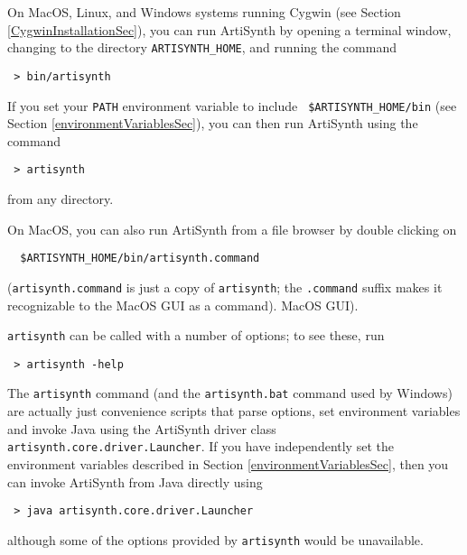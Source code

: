\documentclass{article}
\begin{document}

On MacOS, Linux, and Windows systems running Cygwin (see
Section \ref{CygwinInstallationSec}), you can run ArtiSynth by opening a terminal
window, changing to the directory {\tt ARTISYNTH\_HOME}, and running the
command

\begin{verbatim}
 > bin/artisynth
\end{verbatim}

If you set your {\tt PATH} environment variable to include {\tt
\$ARTISYNTH\_HOME/bin} (see Section \ref{environmentVariablesSec}), you
can then run ArtiSynth using the command

\begin{verbatim}
 > artisynth
\end{verbatim}

from any directory.

On MacOS, you can also run ArtiSynth from a file browser by double
clicking on
\begin{verbatim}
  $ARTISYNTH_HOME/bin/artisynth.command
\end{verbatim}
({\tt artisynth.command} is just a
copy of {\tt artisynth}; the {\tt .command} suffix makes it
recognizable to the MacOS GUI as a command).
MacOS GUI).

{\tt artisynth} can be called with a number of options; to see these, run

\begin{verbatim}
 > artisynth -help
\end{verbatim}

\begin{sideblock}
The {\tt artisynth} command (and the {\tt artisynth.bat} command used by
Windows) are actually just convenience scripts that parse
options, set environment
variables and invoke Java using the ArtiSynth driver class
{\tt artisynth.core.driver.Launcher}. If you have independently set the
environment variables described in Section \ref{environmentVariablesSec},
then you can invoke ArtiSynth from Java directly using
%
\begin{verbatim}
 > java artisynth.core.driver.Launcher
\end{verbatim}
%
although some of the options provided by {\tt artisynth} would be unavailable.
\end{sideblock}
\end{document}
